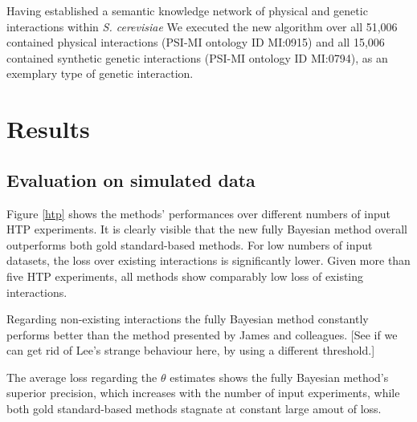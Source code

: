 \documentclass{bioinfo}
\newcommand{\species}[1]{\textit{#1}}
\newcommand{\note}[1]{{\color{red}[#1]}}
\begin{document}
\begin{methods}
Having established a semantic knowledge network of physical and genetic interactions within \species{S. cerevisiae} We executed the new algorithm over all 51,006 contained physical interactions (PSI-MI ontology ID MI:0915) and all 15,006 contained synthetic genetic interactions (PSI-MI ontology ID MI:0794), as an exemplary type of genetic interaction.

\end{methods}

\section{Results}

\subsection{Evaluation on simulated data}

Figure \ref{htp} shows the methods' performances over different numbers of input HTP experiments. It is clearly visible that the new fully Bayesian method overall outperforms both gold standard-based methods. For low numbers of input datasets, the loss over existing interactions is significantly lower. Given more than five HTP experiments, all methods show comparably low loss of existing interactions. 

Regarding non-existing interactions the fully Bayesian method constantly performs better than the method presented by James and colleagues. \note{See if we can get rid of Lee's strange behaviour here, by using a different threshold.}

The average loss regarding the $\theta$ estimates shows the fully Bayesian method's superior precision, which increases with the number of input experiments, while both gold standard-based methods stagnate at constant large amout of loss.
\end{document}
